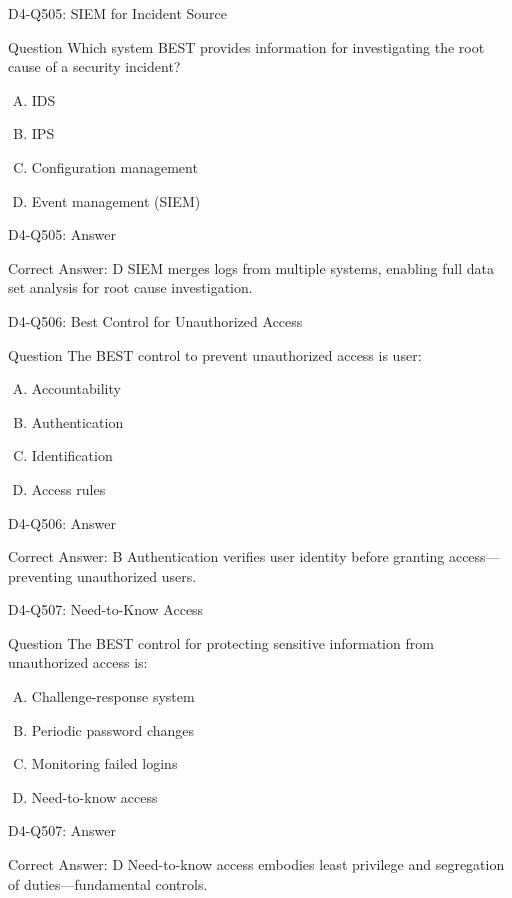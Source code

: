 \documentclass{beamer}
\begin{document}
\begin{frame}{D4-Q505: SIEM for Incident Source}
	\begin{block}{Question}
		Which system BEST provides information for investigating the root cause of a security incident?
	\end{block}
	\begin{enumerate}[(A)]
		\item IDS
		\item IPS
		\item Configuration management
		\item Event management (SIEM)
	\end{enumerate}
\end{frame}
\begin{frame}{D4-Q505: Answer}
	\begin{block}{Correct Answer: D}
		SIEM merges logs from multiple systems, enabling full data set analysis for root cause investigation.
	\end{block}
\end{frame}

\begin{frame}{D4-Q506: Best Control for Unauthorized Access}
	\begin{block}{Question}
		The BEST control to prevent unauthorized access is user:
	\end{block}
	\begin{enumerate}[(A)]
		\item Accountability
		\item Authentication
		\item Identification
		\item Access rules
	\end{enumerate}
\end{frame}
\begin{frame}{D4-Q506: Answer}
	\begin{block}{Correct Answer: B}
		Authentication verifies user identity before granting access—preventing unauthorized users.
	\end{block}
\end{frame}

\begin{frame}{D4-Q507: Need-to-Know Access}
	\begin{block}{Question}
		The BEST control for protecting sensitive information from unauthorized access is:
	\end{block}
	\begin{enumerate}[(A)]
		\item Challenge-response system
		\item Periodic password changes
		\item Monitoring failed logins
		\item Need-to-know access
	\end{enumerate}
\end{frame}
\begin{frame}{D4-Q507: Answer}
	\begin{block}{Correct Answer: D}
		Need-to-know access embodies least privilege and segregation of duties—fundamental controls.
	\end{block}
\end{frame}
\end{document}
